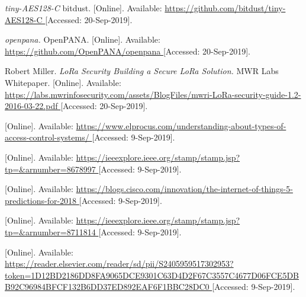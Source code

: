 \begin{thebibliography}{9}


\textit{
tiny-AES128-C
}
bitdust.
[Online]. Available:
\url{
https://github.com/bitdust/tiny-AES128-C
}
[Accessed: 20-Sep-2019].



\textit{
openpana.
}
OpenPANA.
[Online]. Available:
\url{
https://github.com/OpenPANA/openpana
}
[Accessed: 20-Sep-2019].



Robert Miller.
\textit{
LoRa Security
Building a Secure LoRa Solution.
}
MWR Labs Whitepaper.
[Online]. Available:
\url{
https://labs.mwrinfosecurity.com/assets/BlogFiles/mwri-LoRa-security-guide-1.2-2016-03-22.pdf
}
[Accessed: 20-Sep-2019].






[Online]. Available:
\url{
https://www.elprocus.com/understanding-about-types-of-access-control-systems/
}
[Accessed: 9-Sep-2019].




[Online]. Available:
\url{
https://ieeexplore.ieee.org/stamp/stamp.jsp?tp=&arnumber=8678997
}
[Accessed: 9-Sep-2019].



[Online]. Available:
\url{
https://blogs.cisco.com/innovation/the-internet-of-things-5-predictions-for-2018
}
[Accessed: 9-Sep-2019].



[Online]. Available:
\url{
https://ieeexplore.ieee.org/stamp/stamp.jsp?tp=&arnumber=8711814
}
[Accessed: 9-Sep-2019].



[Online]. Available:
\url{
https://reader.elsevier.com/reader/sd/pii/S2405959517302953?token=1D12BD2186DD8FA9065DCE9301C63D4D2F67C3557C4677D06FCE5DBB92C96984BFCF132B6DD37ED892EAF6F1BBC28DC0
}
[Accessed: 9-Sep-2019].


\end{thebibliography}
